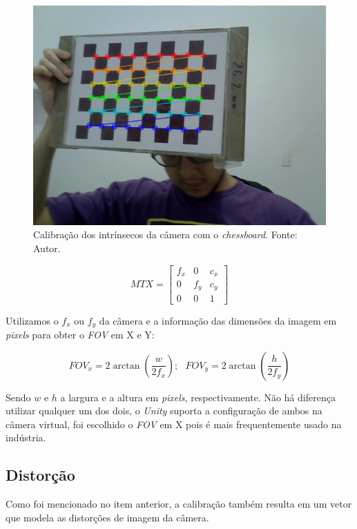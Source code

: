 \begin{figure}[ht]
    \centering
    \includegraphics[width=.45\linewidth]{figuras/chessboard.png}
    \caption{Calibração dos intrínsecos da câmera com o \textit{chessboard}. Fonte: Autor.}
    \label{fig:chess_calib}
\end{figure}

\[ MTX = 
\begin{bmatrix}
    f_x & 0 & c_x \\    
    0 & f_y & c_y \\
    0 & 0 & 1
\end{bmatrix} \]

Utilizamos o \(f_x\) ou \(f_y\) da câmera e a informação das dimensões da imagem em \textit{pixels} para obter o \textit{FOV} em X e Y: 

\[
FOV_x = 2 \arctan \left( \dfrac{w}{2f_x} \right) ;
\ \ \ FOV_y = 2 \arctan \left( \dfrac{h}{2f_y} \right) 
\]
    
Sendo \(w\) e \(h\) a largura e a altura em \textit{pixels}, respectivamente. Não há diferença utilizar qualquer um dos dois, o \textit{Unity} suporta a configuração de ambos na câmera virtual, foi escolhido o \textit{FOV} em X pois é mais frequentemente usado na indústria. 
    
\subsection{Distorção}

Como foi mencionado no item anterior, a calibração também resulta em um vetor que modela as distorções de imagem da câmera. 


    
    
